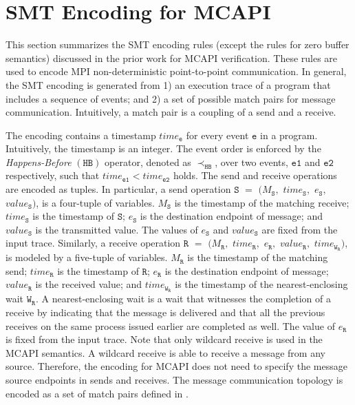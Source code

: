 \section{SMT Encoding for MCAPI}
This section summarizes the SMT encoding rules (except the rules for zero buffer semantics) discussed in the prior work for MCAPI verification. These rules are used to encode MPI non-deterministic point-to-point communication. In general, the SMT encoding is generated from 1) an execution trace of a program that includes a sequence of events; and 2) a set of possible match pairs for message communication. Intuitively, a match pair is a coupling of a send and a receive. 


The encoding contains a timestamp $\mathit{time}_\mathtt{e}$ for every event $\mathtt{e}$ in a program. Intuitively, the timestamp is an integer.  The event order is enforced by the \emph{Happens-Before} $(\mathtt{HB})$ operator, denoted as
$\mathrm{\prec_\mathtt{HB}}$, over two events, $\mathtt{e1}$ and $\mathtt{e2}$ respectively, such that $\mathit{time}_\mathtt{e1} <  \mathit{time}_\mathtt{e2}$ holds. The send and receive operations are encoded as tuples. In particular, a send operation $\mathtt{S}$ $=$ $(M_\mathtt{S},$ $\mathit{time}_\mathtt{S},$ $e_\mathtt{S},$ $\mathit{value}_\mathtt{S})$, is a four-tuple of variables. $M_\mathtt{S}$ is the timestamp of the matching receive; $\mathit{time}_\mathtt{S}$ is the timestamp of $\mathtt{S}$; $e_\mathtt{S}$ is the destination endpoint of message; and $\mathit{value}_\mathtt{S}$ is the transmitted value. The values of $e_\mathtt{S}$ and $\mathit{value}_\mathtt{S}$ are fixed from the input trace. Similarly, a receive operation $\mathtt{R}$ $=$ $(M_\mathtt{R},$ $\mathit{time}_\mathtt{R},$ $e_\mathtt{R},$ $\mathit{value}_\mathtt{R},$ $\mathit{time}_{\mathtt{W}_\mathtt{R}})$, is modeled by a five-tuple of variables. $M_\mathtt{R}$ is the timestamp of the matching send; $\mathit{time}_\mathtt{R}$ is the timestamp of $\mathtt{R}$; $e_\mathtt{R}$ is the destination endpoint of message; $\mathit{value}_\mathtt{R}$ is the received value; and $\mathit{time}_{\mathtt{W}_\mathtt{R}}$ is the timestamp of the nearest-enclosing wait ${\mathtt{W}_\mathtt{R}}$. A nearest-enclosing wait is a wait that witnesses the completion of a receive by indicating that the message is delivered and that all the previous receives on the same process issued earlier are completed as well. The value of $e_\mathtt{R}$ is fixed from the input trace. Note that only wildcard receive is used in the MCAPI semantics. A wildcard receive is able to receive a message from any source. Therefore, the encoding for MCAPI does not need to specify the message source endpoints in sends and receives. The message communication topology is encoded as a set of match pairs defined in .

